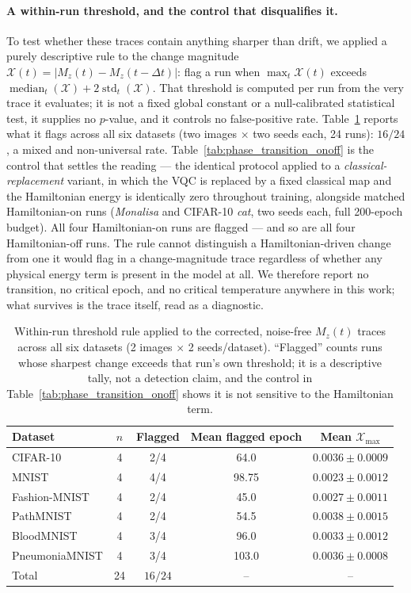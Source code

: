 \documentclass[11pt]{article}
\begin{document}
\paragraph{A within-run threshold, and the control that disqualifies it.} To test whether these traces contain anything sharper than drift, we applied a purely descriptive rule to the change magnitude $\mathcal{X}(t)=|M_z(t)-M_z(t-\Delta t)|$: flag a run when $\max_t \mathcal{X}(t)$ exceeds $\operatorname{median}_t(\mathcal{X}) + 2\operatorname{std}_t(\mathcal{X})$. That threshold is computed per run from the very trace it evaluates; it is not a fixed global constant or a null-calibrated statistical test, it supplies no $p$-value, and it controls no false-positive rate. Table~\ref{tab:phase_transition_corrected} reports what it flags across all six datasets (two images $\times$ two seeds each, 24 runs): $16/24$, a mixed and non-universal rate. Table~\ref{tab:phase_transition_onoff} is the control that settles the reading --- the identical protocol applied to a \emph{classical-replacement} variant, in which the VQC is replaced by a fixed classical map and the Hamiltonian energy is identically zero throughout training, alongside matched Hamiltonian-on runs (\textit{Monalisa} and CIFAR-10 \textit{cat}, two seeds each, full 200-epoch budget). All four Hamiltonian-on runs are flagged --- and so are all four Hamiltonian-off runs. The rule cannot distinguish a Hamiltonian-driven change from one it would flag in a change-magnitude trace regardless of whether any physical energy term is present in the model at all. We therefore report no transition, no critical epoch, and no critical temperature anywhere in this work; what survives is the trace itself, read as a diagnostic.

\begin{table}[H]
\centering
\caption{Within-run threshold rule applied to the corrected, noise-free $M_z(t)$ traces across all six datasets (2 images $\times$ 2 seeds/dataset). ``Flagged'' counts runs whose sharpest change exceeds that run's own threshold; it is a descriptive tally, not a detection claim, and the control in Table~\ref{tab:phase_transition_onoff} shows it is not sensitive to the Hamiltonian term.}
\label{tab:phase_transition_corrected}
\scriptsize
\begin{tabular}{lcccc}
\toprule
Dataset & $n$ & Flagged & Mean flagged epoch & Mean $\mathcal{X}_{\max}$ \\
\midrule
CIFAR-10 & 4 & 2/4 & 64.0 & $0.0036\pm0.0009$ \\
MNIST & 4 & 4/4 & 98.75 & $0.0023\pm0.0012$ \\
Fashion-MNIST & 4 & 2/4 & 45.0 & $0.0027\pm0.0011$ \\
PathMNIST & 4 & 2/4 & 54.5 & $0.0038\pm0.0015$ \\
BloodMNIST & 4 & 3/4 & 96.0 & $0.0033\pm0.0012$ \\
PneumoniaMNIST & 4 & 3/4 & 103.0 & $0.0036\pm0.0008$ \\
\midrule
Total & 24 & $16/24$ & -- & -- \\
\bottomrule
\end{tabular}
\end{table}
\end{document}
